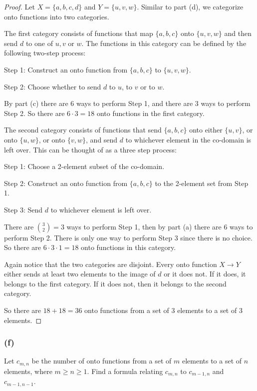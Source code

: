 \documentclass[14pt]{extarticle}
\newcommand{\cy}{\color{cyan}}
\begin{document}
\begin{proof}
     Let \(X = \{a, b, c, d\}\) and \(Y = \{u, v, w\}\). Similar to part (d), we categorize onto functions into two categories.

     The first category consists of functions that map \(\{a,b,c\}\) onto \(\{u,v,w\}\) and then send \(d\) to one of \(u,v\) or
     \(w\). The functions in this category can be defined by the following two-step process:

     {\cy Step 1:} Construct an onto function from \(\{a, b, c\}\) to \(\{u, v, w\}\).

          {\cy Step 2:} Choose whether to send \(d\) to \(u\), to \(v\) or to \(w\).

     By part (c) there are 6 ways to perform Step 1, and there are 3 ways to perform Step 2. So there are \(6 \cdot 3 = 18\) onto
     functions in the first category.

     The second category consists of functions that send \(\{a,b,c\}\) onto either \(\{u,v\}\), or onto \(\{u,w\}\), or
     onto \(\{v,w\}\), and send \(d\) to whichever element in the co-domain is left over. This can be thought of as a three step
     process:

     {\cy Step 1:} Choose a 2-element subset of the co-domain.

     {\cy Step 2:} Construct an onto function from \(\{a,b,c\}\) to the 2-element set from Step 1.

          {\cy Step 3:} Send \(d\) to whichever element is left over.

     There are \(\binom{3}{2} = 3\) ways to perform Step 1, then by part (a) there are 6 ways to perform Step 2. There is only one
     way to perform Step 3 since there is no choice. So there are \(6 \cdot 3 \cdot 1 = 18\) onto functions in this category.

     Again notice that the two categories are disjoint. Every onto function \(X \to Y\) either sends at least two elements to the
     image of \(d\) or it does not. If it does, it belongs to the first category. If it does not, then it belongs to the second category.

     So there are \(18+18 = 36\) onto functions from a set of 3 elements to a set of 3 elements.
\end{proof}

\subsubsection{(f)}
Let \(c_{m,n}\) be the number of onto functions from a set of \(m\) elements to a set of \(n\) elements, where
\(m \geq n \geq 1\). Find a formula relating \(c_{m,n}\) to \(c_{m-1,n}\) and \(c_{m-1,n-1}\).
\end{document}
